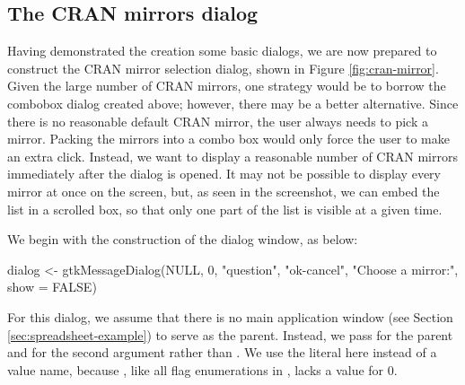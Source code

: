 \documentclass[article,shortnames]{jss}
\begin{document}
\subsection{The CRAN mirrors dialog}

Having demonstrated the creation some basic dialogs, we are now
prepared to construct the CRAN mirror selection dialog, shown in
Figure \ref{fig:cran-mirror}.  Given the large number of CRAN mirrors,
one strategy would be to borrow the combobox dialog created above;
however, there may be a better alternative. Since there is no
reasonable default CRAN mirror, the user always needs to pick a
mirror. Packing the mirrors into a combo box would only force the user
to make an extra click.  Instead, we want to display a reasonable
number of CRAN mirrors immediately after the dialog is opened. It may
not be possible to display every mirror at once on the screen, but, as
seen in the screenshot, we can embed the list in a scrolled box, so
that only one part of the list is visible at a given time.

We begin with the construction of the dialog window, as below:
\begin{Code}
dialog <- gtkMessageDialog(NULL, 0, "question", "ok-cancel", 
                            "Choose a mirror:", show = FALSE)
\end{Code}
For this dialog,
we assume that there is no main application window (see Section
\ref{sec:spreadsheet-example}) to serve as the
parent. 
Instead, we pass  for the parent and  
for the second argument rather than . We
use the literal  here instead of a value name, because
, like all flag enumerations in , lacks
a value for $0$.
\end{document}
